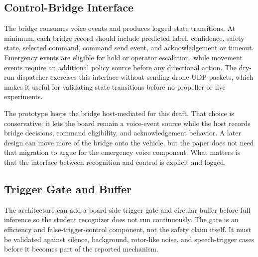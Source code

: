 \subsection{Control-Bridge Interface}

The bridge consumes voice events and produces logged state transitions. At minimum, each bridge record should include predicted label, confidence, safety state, selected command, command send event, and acknowledgement or timeout. Emergency events are eligible for hold or operator escalation, while movement events require an additional policy source before any directional action. The dry-run dispatcher exercises this interface without sending drone UDP packets, which makes it useful for validating state transitions before no-propeller or live experiments.

The prototype keeps the bridge host-mediated for this draft. That choice is conservative: it lets the board remain a voice-event source while the host records bridge decisions, command eligibility, and acknowledgement behavior. A later design can move more of the bridge onto the vehicle, but the paper does not need that migration to argue for the emergency voice component. What matters is that the interface between recognition and control is explicit and logged.

\subsection{Trigger Gate and Buffer}

The architecture can add a board-side trigger gate and circular buffer before full inference so the student recognizer does not run continuously. The gate is an efficiency and false-trigger-control component, not the safety claim itself. It must be validated against silence, background, rotor-like noise, and speech-trigger cases before it becomes part of the reported mechanism.
